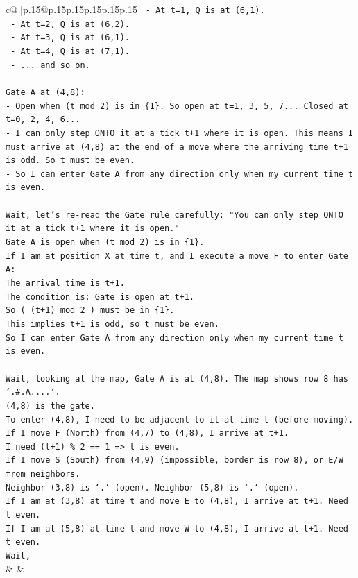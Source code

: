 \documentclass{article}
\begin{document}
{\begin{supertabular}{c@{$\;$}|p{.15\linewidth}@{}p{.15\linewidth}p{.15\linewidth}p{.15\linewidth}p{.15\linewidth}p{.15\linewidth}}
{{{\texttt{  {-} At t=1, Q is at (6,1).} \\
\texttt{  {-} At t=2, Q is at (6,2).} \\
\texttt{  {-} At t=3, Q is at (6,1).} \\
\texttt{  {-} At t=4, Q is at (7,1).} \\
\texttt{  {-} ... and so on.} \\
\\ 
\texttt{Gate A at (4,8):} \\
\texttt{{-} Open when (t mod 2) is in \{1\}. So open at t=1, 3, 5, 7... Closed at t=0, 2, 4, 6...} \\
\texttt{{-} I can only step ONTO it at a tick t+1 where it is open. This means I must arrive at (4,8) at the end of a move where the arriving time t+1 is odd. So t must be even.} \\
\texttt{{-} So I can enter Gate A from any direction only when my current time t is even.} \\
\\ 
\texttt{Wait, let's re{-}read the Gate rule carefully: "You can only step ONTO it at a tick t+1 where it is open."} \\
\texttt{Gate A is open when (t mod 2) is in \{1\}.} \\
\texttt{If I am at position X at time t, and I execute a move F to enter Gate A:} \\
\texttt{The arrival time is t+1.} \\
\texttt{The condition is: Gate is open at t+1.} \\
\texttt{So ( (t+1) mod 2 ) must be in \{1\}.} \\
\texttt{This implies t+1 is odd, so t must be even.} \\
\texttt{So I can enter Gate A from any direction only when my current time t is even.} \\
\\ 
\texttt{Wait, looking at the map, Gate A is at (4,8). The map shows row 8 has `.\#.A....`.} \\
\texttt{(4,8) is the gate.} \\
\texttt{To enter (4,8), I need to be adjacent to it at time t (before moving).} \\
\texttt{If I move F (North) from (4,7) to (4,8), I arrive at t+1.} \\
\texttt{I need (t+1) \% 2 == 1 => t is even.} \\
\texttt{If I move S (South) from (4,9) (impossible, border is row 8), or E/W from neighbors.} \\
\texttt{Neighbor (3,8) is `.` (open). Neighbor (5,8) is `.` (open).} \\
\texttt{If I am at (3,8) at time t and move E to (4,8), I arrive at t+1. Need t even.} \\
\texttt{If I am at (5,8) at time t and move W to (4,8), I arrive at t+1. Need t even.} \\
\texttt{Wait,} \\
            }
        }
    }
    & & \\ \\


\end{supertabular}}
\end{document}
